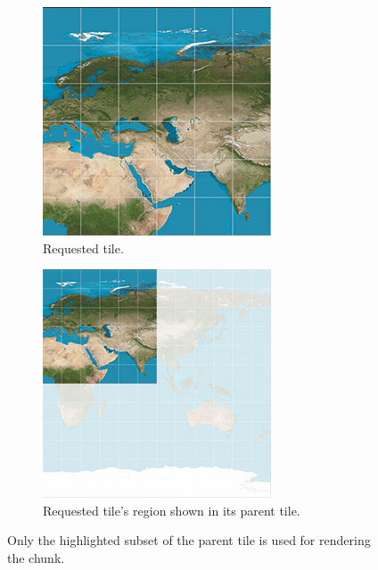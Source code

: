 \begin{figure}[htbp]
    \centering
    \begin{subfigure}[t]{0.3\textwidth}
        \includegraphics[width=\textwidth]{figures/implementation/chunktile/chunktile1.jpg}
        \caption{Requested tile.}
    \end{subfigure}
    \quad
    \begin{subfigure}[t]{0.3\textwidth}
        \includegraphics[width=\textwidth]{figures/implementation/chunktile/chunktile2.jpg}
        \caption{Requested tile's region shown in its parent tile.}
    \end{subfigure}
    \caption{Only the highlighted subset of the parent tile is used for rendering the chunk.}
    \label{fig:tiles}
\end{figure}

